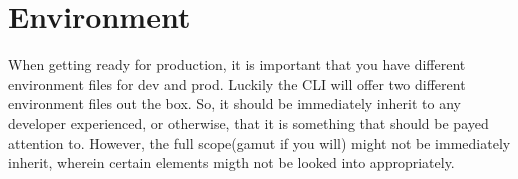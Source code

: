 \maketitle{}
\section{ Environment }

When getting ready for production, it is important that you have different
environment files for dev and prod. Luckily the CLI will offer two different
environment files out the box. So, it should be immediately inherit to any
developer experienced, or otherwise, that it is something that should be payed
attention to. However, the full scope(gamut if you will) might not be
immediately inherit, wherein certain elements migth not be looked into
appropriately.

